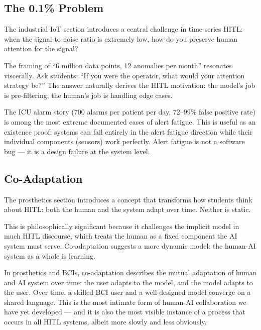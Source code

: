 \subsection{The 0.1\% Problem}

The industrial IoT section introduces a central challenge in time-series HITL: when the signal-to-noise ratio is extremely low, how do you preserve human attention for the signal?

The framing of ``6 million data points, 12 anomalies per month'' resonates viscerally. Ask students: ``If you were the operator, what would your attention strategy be?'' The answer naturally derives the HITL motivation: the model's job is pre-filtering; the human's job is handling edge cases.

\begin{cautionbox}
The ICU alarm story (700 alarms per patient per day, 72--99\% false positive rate) is among the most extreme documented cases of alert fatigue. This is useful as an existence proof: systems can fail entirely in the alert fatigue direction while their individual components (sensors) work perfectly. Alert fatigue is not a software bug --- it is a design failure at the system level.
\end{cautionbox}

\subsection{Co-Adaptation}

The prosthetics section introduces a concept that transforms how students think about HITL: both the human and the system adapt over time. Neither is static.

This is philosophically significant because it challenges the implicit model in much HITL discourse, which treats the human as a fixed component the AI system must serve. Co-adaptation suggests a more dynamic model: the human-AI system as a whole is learning.

\begin{keyconcept}[Co-Adaptation]
In prosthetics and BCIs, co-adaptation describes the mutual adaptation of human and AI system over time: the user adapts to the model, and the model adapts to the user. Over time, a skilled BCI user and a well-designed model converge on a shared language. This is the most intimate form of human-AI collaboration we have yet developed --- and it is also the most visible instance of a process that occurs in all HITL systems, albeit more slowly and less obviously.
\end{keyconcept}

